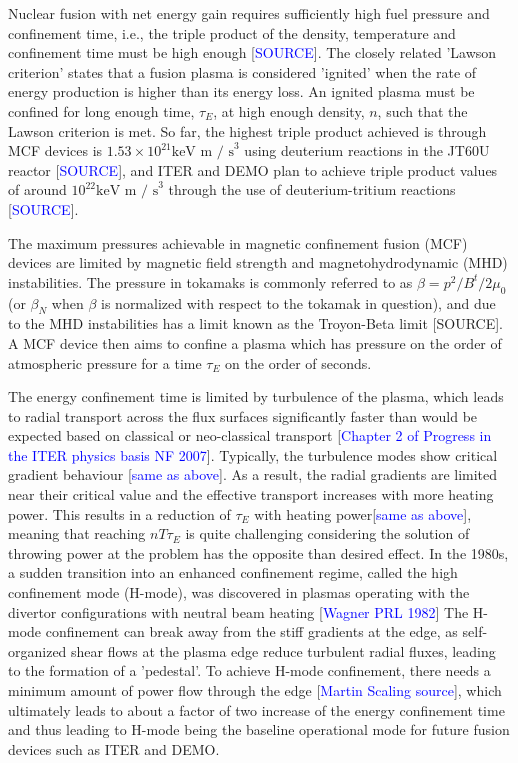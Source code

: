 \documentclass[a4paper, twoside, final, 12pt]{article}
\begin{document}
Nuclear fusion with net energy gain requires sufficiently high fuel pressure and confinement time, i.e., the triple product of the density, temperature and confinement time must be high enough [\textcolor{blue}{SOURCE}].
The closely related 'Lawson criterion' states that a fusion plasma is considered 'ignited' when the rate of energy production is higher than its energy loss.
An ignited plasma must be confined for long enough time, $\tau_E$, at high enough density, $n$, such that the Lawson criterion is met.
So far, the highest triple product achieved is through MCF devices is $1.53\times 10^{21} \text{keV m / s}^3$ using deuterium reactions in the JT60U reactor [\textcolor{blue}{SOURCE}], and ITER and DEMO plan to achieve triple product values of around $10^{22}\text{keV m / s}^3$ through the use of deuterium-tritium reactions [\textcolor{blue}{SOURCE}].

The maximum pressures achievable in magnetic confinement fusion (MCF) devices are limited by magnetic field strength and magnetohydrodynamic (MHD) instabilities.
The pressure in tokamaks is commonly referred to as $\beta = p^2 / B^t / 2\mu_0$ (or $\beta_N$ when $\beta$ is normalized with respect to the tokamak in question), and due to the MHD instabilities has a limit known as the Troyon-Beta limit [SOURCE].
A MCF device then aims to confine a plasma which has pressure on the order of atmospheric pressure for a time $\tau_E$ on the order of seconds.

The energy confinement time is limited by turbulence of the plasma, which leads to radial transport across the flux surfaces significantly faster than would be expected based on classical or neo-classical transport [\textcolor{blue}{Chapter 2 of Progress in the ITER physics basis NF 2007}].
Typically, the turbulence modes show critical gradient behaviour [\textcolor{blue}{same as above}].
As a result, the radial gradients are limited near their critical value and the effective transport increases with more heating power.
This results in a reduction of $\tau_E$ with heating power[\textcolor{blue}{same as above}], meaning that reaching $nT\tau_E$ is quite challenging considering the solution of throwing power at the problem has the opposite than desired effect.
In the 1980s, a sudden transition into an enhanced confinement regime, called the high confinement mode (H-mode), was discovered in plasmas operating with the divertor configurations with neutral beam heating [\textcolor{blue}{Wagner PRL 1982}]
The H-mode confinement can break away from the stiff gradients at the edge, as self-organized shear flows at the plasma edge reduce turbulent radial fluxes, leading to the formation of a 'pedestal'.
To achieve H-mode confinement, there needs a minimum amount of power flow through the edge [\textcolor{blue}{Martin Scaling source}], which ultimately leads to about a factor of two increase of the energy confinement time and thus leading to H-mode being the baseline operational mode for future fusion devices such as ITER and DEMO.
\end{document}

